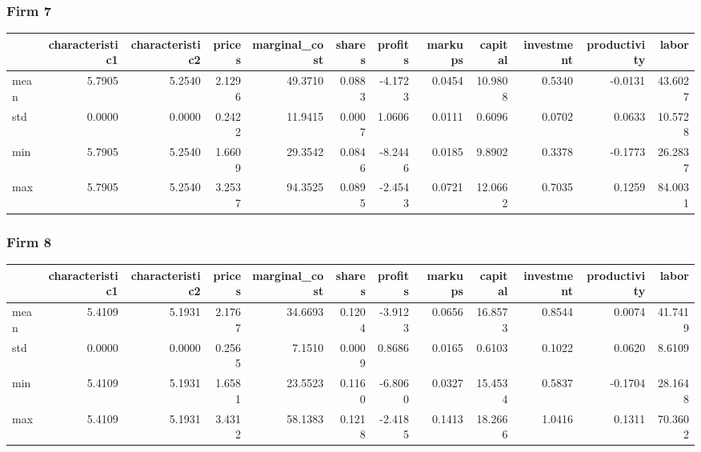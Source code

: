  \subsubsection*{Firm 7}
\begin{tabular}{lrrrrrrrrrrr}
\toprule
{} &  characteristic1 &  characteristic2 &  prices &  marginal\_cost &  shares &  profits &  markups &  capital &  investment &  productivity &   labor \\
\midrule
mean &           5.7905 &           5.2540 &  2.1296 &        49.3710 &  0.0883 &  -4.1723 &   0.0454 &  10.9808 &      0.5340 &       -0.0131 & 43.6027 \\
std  &           0.0000 &           0.0000 &  0.2422 &        11.9415 &  0.0007 &   1.0606 &   0.0111 &   0.6096 &      0.0702 &        0.0633 & 10.5728 \\
min  &           5.7905 &           5.2540 &  1.6609 &        29.3542 &  0.0846 &  -8.2446 &   0.0185 &   9.8902 &      0.3378 &       -0.1773 & 26.2837 \\
max  &           5.7905 &           5.2540 &  3.2537 &        94.3525 &  0.0895 &  -2.4543 &   0.0721 &  12.0662 &      0.7035 &        0.1259 & 84.0031 \\
\bottomrule
\end{tabular}


 \subsubsection*{Firm 8}
\begin{tabular}{lrrrrrrrrrrr}
\toprule
{} &  characteristic1 &  characteristic2 &  prices &  marginal\_cost &  shares &  profits &  markups &  capital &  investment &  productivity &   labor \\
\midrule
mean &           5.4109 &           5.1931 &  2.1767 &        34.6693 &  0.1204 &  -3.9123 &   0.0656 &  16.8573 &      0.8544 &        0.0074 & 41.7419 \\
std  &           0.0000 &           0.0000 &  0.2565 &         7.1510 &  0.0009 &   0.8686 &   0.0165 &   0.6103 &      0.1022 &        0.0620 &  8.6109 \\
min  &           5.4109 &           5.1931 &  1.6581 &        23.5523 &  0.1160 &  -6.8060 &   0.0327 &  15.4534 &      0.5837 &       -0.1704 & 28.1648 \\
max  &           5.4109 &           5.1931 &  3.4312 &        58.1383 &  0.1218 &  -2.4185 &   0.1413 &  18.2666 &      1.0416 &        0.1311 & 70.3602 \\
\bottomrule
\end{tabular}


